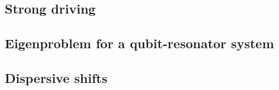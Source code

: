 \documentclass[aspectratio=169, 13pt]{beamer}
\begin{document}
\subsection{Strong driving}
\frame{\frametitle{\secname}\framesubtitle{\subsecname}

}


\subsection{Eigenproblem for a qubit-resonator system}
\frame{\frametitle{\secname}\framesubtitle{\subsecname}

}

\subsection{Dispersive shifts}
\frame{\frametitle{\secname}\framesubtitle{\subsecname} 

}



\appendix
\end{document}
